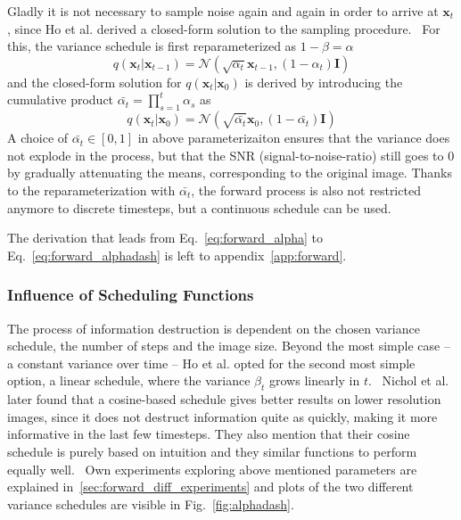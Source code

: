 Gladly it is not necessary to sample noise again and again in order to arrive at $\bm{x}_t$, since Ho et al. derived a closed-form solution to the sampling procedure.~\autocite{ho2020denoising} For this, the variance schedule is first reparameterized as $1-\beta = \alpha$
\begin{equation}
    q(\bm{x}_t | \bm{x}_{t-1}) = \mathcal{N}(\sqrt{\alpha_t} \bm{x}_{t-1}, (1-\alpha_t) \bm{I})
    \label{eq:forward_alpha}
\end{equation}
and the closed-form solution for $q(\bm{x}_t|\bm{x}_0)$ is derived by introducing the cumulative product $\bar{\alpha_t} = \prod_{s=1}^{t}\alpha_s$ as
\begin{equation}
    q(\bm{x}_t|\bm{x}_0) = \mathcal{N}(\sqrt{\bar{\alpha_t}}\bm{x}_0, (1-\bar{\alpha_t})\bm{I})
    \label{eq:forward_alphadash}
\end{equation}
A choice of $\bar{\alpha_t} \in [0,1]$ in above parameterizaiton ensures that the variance does not explode in the process, but that the SNR (signal-to-noise-ratio) still goes to 0 by gradually attenuating the means, corresponding to the original image. Thanks to the reparameterization with $\bar{\alpha_t}$, the forward process is also not restricted anymore to discrete timesteps, but a continuous schedule can be used.~\autocite{kingma2023variational,song2021scorebased}

The derivation that leads from Eq.~\ref{eq:forward_alpha} to Eq.~\ref{eq:forward_alphadash} is left to appendix~\ref{app:forward}.

\subsubsection{Influence of Scheduling Functions}
The process of information destruction is dependent on the chosen variance schedule, the number of steps and the image size. Beyond the most simple case -- a constant variance over time -- Ho et al. opted for the second most simple option, a linear schedule, where the variance $\beta_t$ grows linearly in $t$.~\autocite{ho2020denoising} Nichol et al. later found that a cosine-based schedule gives better results on lower resolution images, since it does not destruct information quite as quickly, making it more informative in the last few timesteps. They also mention that their cosine schedule is purely based on intuition and they similar functions to perform equally well.~\autocite{nichol2021improved}  Own experiments exploring above mentioned parameters are explained in~\ref{sec:forward_diff_experiments} and plots of the two different variance schedules are visible in Fig.~\ref{fig:alphadash}.

